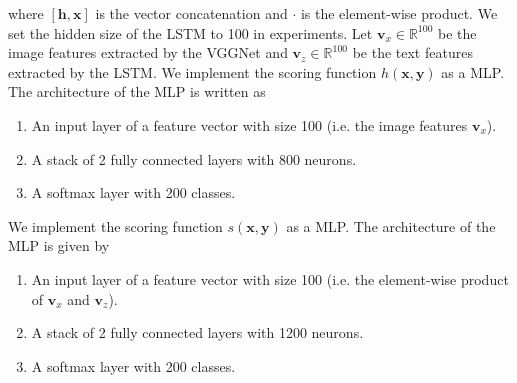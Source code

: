 \documentclass{article}
\newcommand{\OVEC}[1]{\bm{#1}} %
\newcommand{\stdscore}{h(\OVEC{x},\OVEC{y})}
\newcommand{\priscore}{s(\OVEC{x},\OVEC{y})}
\begin{document}
where $[\OVEC{h},\OVEC{x}]$ is the vector concatenation and $\cdot$ is the element-wise product.
We set the hidden size of the LSTM to 100 in experiments.
Let $\OVEC{v}_{x} \in \mathbb{R}^{100}$ be the image features extracted by the VGGNet and $\OVEC{v}_{z} \in \mathbb{R}^{100}$ be the text features extracted by the LSTM.
We implement the scoring function $\stdscore$ as a MLP.
The architecture of the MLP is written as
\begin{enumerate}
\item An input layer of a feature vector with size 100 (i.e. the image features $\OVEC{v}_{x}$).
\item A stack of 2 fully connected layers with 800 neurons.
\item A softmax layer with 200 classes.
\end{enumerate}
We implement the scoring function $\priscore$ as a MLP.
The architecture of the MLP is given by
\begin{enumerate}
\item An input layer of a feature vector with size 100 (i.e. the element-wise product of $\OVEC{v}_{x}$ and $\OVEC{v}_{z}$).
\item A stack of 2 fully connected layers with 1200 neurons.
\item A softmax layer with 200 classes.
\end{enumerate}
\end{document}
